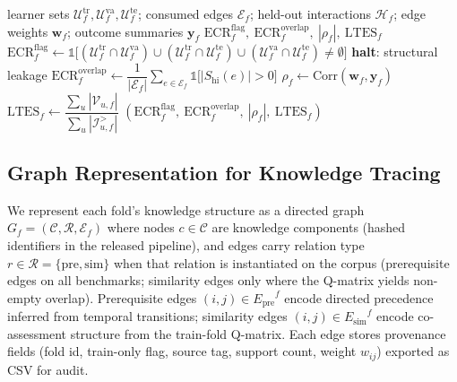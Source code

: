 \documentclass[preprint,10pt,doubleblind]{elsarticle}
\newcommand{\Epre}{\ensuremath{E_{\text{pre}}}}
\newcommand{\Esim}{\ensuremath{E_{\text{sim}}}}
\newcommand{\KCs}{knowledge components}
\begin{document}
\begin{algorithm}[t]
\caption{Edge-provenance leakage audit for fold $f$}
\label{alg:leak-audit}
\begin{algorithmic}[1]
\Require learner sets $\mathcal{U}^{\mathrm{tr}}_f,\mathcal{U}^{\mathrm{va}}_f,\mathcal{U}^{\mathrm{te}}_f$;
  consumed edges $\mathcal{E}_f$; held-out interactions $\mathcal{H}_f$;
  edge weights $\mathbf{w}_f$; outcome summaries $\mathbf{y}_f$
\Ensure $\mathrm{ECR}^{\mathrm{flag}}_f,\ \mathrm{ECR}^{\mathrm{overlap}}_f,\ |\rho_f|,\ \mathrm{LTES}_f$
\State $\mathrm{ECR}^{\mathrm{flag}}_f \gets \mathbb{1}\big[(\mathcal{U}^{\mathrm{tr}}_f\cap\mathcal{U}^{\mathrm{va}}_f)\cup(\mathcal{U}^{\mathrm{tr}}_f\cap\mathcal{U}^{\mathrm{te}}_f)\cup(\mathcal{U}^{\mathrm{va}}_f\cap\mathcal{U}^{\mathrm{te}}_f)\neq\emptyset\big]$
 \State \textbf{halt}: structural leakage \EndIf
\State $\mathrm{ECR}^{\mathrm{overlap}}_f \gets \dfrac{1}{|\mathcal{E}_f|}\sum_{e\in\mathcal{E}_f}\mathbb{1}\big[|S_{\text{hi}}(e)|>0\big]$ 
\State $\rho_f \gets \mathrm{Corr}(\mathbf{w}_f,\mathbf{y}_f)$ 
\State $\mathrm{LTES}_f \gets \dfrac{\sum_u |\mathcal{V}_{u,f}|}{\sum_u |\mathcal{I}^{>}_{u,f}|}$ 
\State \Return $(\mathrm{ECR}^{\mathrm{flag}}_f,\ \mathrm{ECR}^{\mathrm{overlap}}_f,\ |\rho_f|,\ \mathrm{LTES}_f)$
\end{algorithmic}
\end{algorithm}

\subsection{Graph Representation for Knowledge Tracing}
\label{sec:graph-repr}
We represent each fold's knowledge structure as a directed graph
$G_f=(\mathcal{C},\mathcal{R},\mathcal{E}_f)$ where nodes $c\in\mathcal{C}$
are \KCs{} (hashed identifiers in the released pipeline), and edges carry
relation type $r\in\mathcal{R}=\{\text{pre}, \text{sim}\}$ when that
relation is instantiated on the corpus (prerequisite edges on all benchmarks;
similarity edges only where the Q-matrix yields non-empty overlap). Prerequisite edges $(i,j)\in\Epre^f$ encode directed
precedence inferred from temporal transitions; similarity edges
$(i,j)\in\Esim^f$ encode co-assessment structure from the train-fold
Q-matrix. Each edge stores provenance fields (fold id, train-only flag,
source tag, support count, weight $w_{ij}$) exported as CSV for audit.
\end{document}
